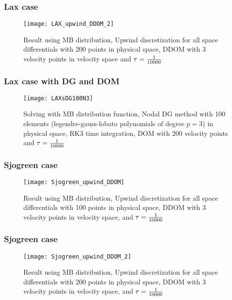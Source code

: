 \begin{frame}
	\frametitle{Lax case}
		
		\begin{figure}
			\centering
				\texttt{[image: LAX\_upwind\_DDOM\_2]}
			\caption{Result using MB distribution, Upwind discretization for all space differentials with 200 points in physical space, DDOM with 3 velocity points in velocity space and $\tau = {1 \over 10000}$}
			\label{fig:MB_Lax_DDOM_2}
		\end{figure}
		
\end{frame}

\begin{frame}
	\frametitle{Lax case with DG and DOM}
			
		\begin{figure}
			\centering
				\texttt{[image: LAXsDG100N3]}
			\caption{Solving with MB distribution function, Nodal DG method with 100 elements (legendre-gauss-lobato polynomials of degree $p=3$) in physical space, RK3 time integration, DOM with 200 velocity points and $\tau = {1 \over 10000}$}
			\label{fig:LAXsDG100N3}
		\end{figure}
	
\end{frame}

\begin{frame}
	\frametitle{Sjogreen case}
		
		\begin{figure}
			\centering
				\texttt{[image: Sjogreen\_upwind\_DDOM]}
			\caption{Result using MB distribution, Upwind discretization for all space differentials with 100 points in physical space, DDOM with 3 velocity points in velocity space, and $\tau = {1 \over 10000}$}
			\label{fig:MB_Sjogreen_DDOM}
		\end{figure}
		
\end{frame}

\begin{frame}
	\frametitle{Sjogreen case}
		
		\begin{figure}
			\centering
				\texttt{[image: Sjogreen\_upwind\_DDOM\_2]}
			\caption{Result using MB distribution, Upwind discretization for all space differentials with 200 points in physical space, DDOM with 3 velocity points in velocity space, and $\tau = {1 \over 10000}$}
			\label{fig:MB_Sjogreen_DDOM_2}
		\end{figure}
		
\end{frame}

